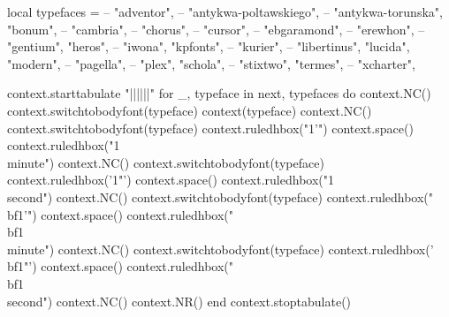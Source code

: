 \startTEXpage[offset=1cm]

\startluacode

local typefaces = {
        -- "adventor",
            -- "antykwa-poltawskiego",
            -- "antykwa-torunska",
    "bonum",
        -- "cambria",
            -- "chorus",
            -- "cursor",
        -- "ebgaramond",
        -- "erewhon",
        -- "gentium",
    "heros",
        -- "iwona",
    "kpfonts",
            -- "kurier",
        -- "libertinus",
  "lucida",
  "modern",
        -- "pagella",
        -- "plex",
  "schola",
        -- "stixtwo",
  "termes",
        -- "xcharter",
}

context.starttabulate { "||||||" }
for _, typeface in next, typefaces do
  context.NC()
    context.switchtobodyfont({typeface})
    context(typeface)
    context.NC()
      context.switchtobodyfont({typeface})
      context.ruledhbox("1'")
      context.space()
      context.ruledhbox("1\\minute")
    context.NC()
      context.switchtobodyfont({typeface})
      context.ruledhbox('1"')
      context.space()
      context.ruledhbox("1\\second")
  context.NC()
    context.switchtobodyfont({typeface})
    context.ruledhbox("\\bf1'")
    context.space()
    context.ruledhbox("\\bf1\\minute")
  context.NC()
    context.switchtobodyfont({typeface})
    context.ruledhbox('\\bf1"')
    context.space()
    context.ruledhbox("\\bf1\\second")
  context.NC()
  context.NR()
end
context.stoptabulate()

\stopluacode

\stopTEXpage
